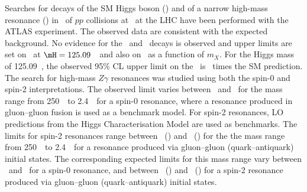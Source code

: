 Searches for \Zg decays of the SM Higgs boson (\htoZg) and of a narrow high-mass resonance (\xtoZg) in 
\lumithirteentev~\invfb of $pp$ collisions at \sqtt~at 
the LHC have been performed with the ATLAS experiment.
The observed data are consistent with the
expected background. No evidence for the \htoZg~and \xtoZg~decays is observed and upper limits
 are set on \sighbr~at $\mH =125.09$~\GeV\ and also on \sigxbr~as a function of $m_X$. 
For the Higgs mass of 125.09~\GeV, the observed 95\% CL upper
limit on the \sighbr~is \mhObserved~times the SM prediction.
The search for high-mass $Z\gamma$
resonances was studied using both the spin-0 and spin-2 interpretations.
The observed limit varies between \highmasslimitlowmX\
and \highmasslimithighmX\ for the mass range from 250~\GeV\ to 2.4~\TeV\
for a spin-0 resonance, where a resonance produced in gluon--gluon fusion is used
as a benchmark model. 
For spin-2 resonances, LO predictions from the Higgs Characterisation Model are used as
benchmarks. The limits for spin-2 resonances range
between \highmasslowlimitgg~(\highmasslowlimitqq)
and \highmasshighlimitgg~(\highmasshighlimitqq) for the the mass range from 250~\GeV\ to 2.4~\TeV\ for a
resonance produced via gluon--gluon (quark--antiquark) initial states. 
The corresponding expected limits for this mass range vary between \highmasslimitlowmXexp\
and \highmasslimithighmXexp\ for a spin-0 resonance, and 
between \highmasslowlimitggexp~(\highmasslowlimitqqexp)
and \highmasshighlimitggexp~(\highmasshighlimitqqexp) for a spin-2
resonance produced via gluon--gluon (quark--antiquark) initial states. 

